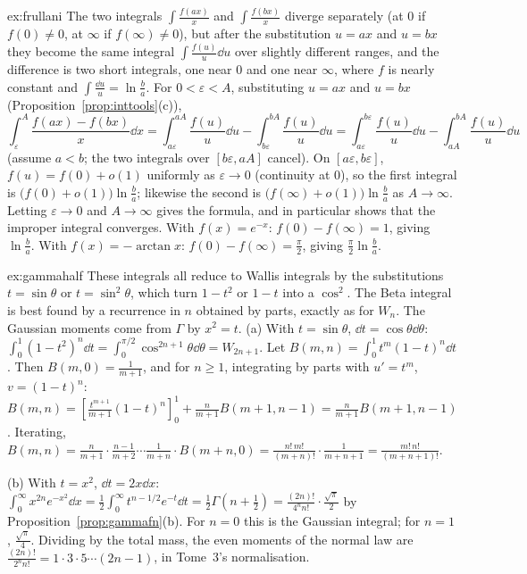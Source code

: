 \begin{solution}{ex:frullani}
\idea The two integrals $\int\frac{f(ax)}x$ and $\int\frac{f(bx)}x$ diverge separately (at $0$ if $f(0)\ne0$, at $\infty$ if $f(\infty)\ne0$), but after the substitution $u=ax$ and $u=bx$ they become the same integral $\int\frac{f(u)}u\dd u$ over slightly different ranges, and the difference is two short integrals, one near $0$ and one near $\infty$, where $f$ is nearly constant and $\int\frac{\dd u}u=\ln\frac ba$.
\writeup For $0<\varepsilon<A$, substituting $u=ax$ and $u=bx$ (Proposition~\ref{prop:inttools}(c)),
\[
\int_\varepsilon^A\frac{f(ax)-f(bx)}x\dd x=\int_{a\varepsilon}^{aA}\frac{f(u)}u\dd u-\int_{b\varepsilon}^{bA}\frac{f(u)}u\dd u=\int_{a\varepsilon}^{b\varepsilon}\frac{f(u)}u\dd u-\int_{aA}^{bA}\frac{f(u)}u\dd u
\]
(assume $a<b$; the two integrals over $[b\varepsilon,aA]$ cancel). On $[a\varepsilon,b\varepsilon]$, $f(u)=f(0)+o(1)$ uniformly as $\varepsilon\to0$ (continuity at $0$), so the first integral is $\bigl(f(0)+o(1)\bigr)\ln\frac ba$; likewise the second is $\bigl(f(\infty)+o(1)\bigr)\ln\frac ba$ as $A\to\infty$. Letting $\varepsilon\to0$ and $A\to\infty$ gives the formula, and in particular shows that the improper integral converges.
With $f(x)=e^{-x}$: $f(0)-f(\infty)=1$, giving $\ln\frac ba$. With $f(x)=-\arctan x$: $f(0)-f(\infty)=\frac\pi2$, giving $\frac\pi2\ln\frac ba$.
\end{solution}

\begin{solution}{ex:gammahalf}
\idea These integrals all reduce to Wallis integrals by the substitutions $t=\sin\theta$ or $t=\sin^2\theta$, which turn $1-t^2$ or $1-t$ into a $\cos^2$. The Beta integral is best found by a recurrence in $n$ obtained by parts, exactly as for $W_n$. The Gaussian moments come from $\Gamma$ by $x^2=t$.
\writeup (a) With $t=\sin\theta$, $\dd t=\cos\theta\dd\theta$: $\int_0^1(1-t^2)^n\dd t=\int_0^{\pi/2}\cos^{2n+1}\theta\dd\theta=W_{2n+1}$.
Let $B(m,n)=\int_0^1t^m(1-t)^n\dd t$. Then $B(m,0)=\frac1{m+1}$, and for $n\ge1$, integrating by parts with $u'=t^m$, $v=(1-t)^n$: $B(m,n)=\left[\frac{t^{m+1}}{m+1}(1-t)^n\right]_0^1+\frac n{m+1}B(m+1,n-1)=\frac n{m+1}B(m+1,n-1)$. Iterating, $B(m,n)=\frac{n}{m+1}\cdot\frac{n-1}{m+2}\cdots\frac1{m+n}\cdot B(m+n,0)=\frac{n!\,m!}{(m+n)!}\cdot\frac1{m+n+1}=\frac{m!\,n!}{(m+n+1)!}$.

(b) With $t=x^2$, $\dd t=2x\dd x$: $\int_0^\infty x^{2n}e^{-x^2}\dd x=\frac12\int_0^\infty t^{n-1/2}e^{-t}\dd t=\frac12\Gamma\left(n+\frac12\right)=\frac{(2n)!}{4^nn!}\cdot\frac{\sqrt\pi}2$ by Proposition~\ref{prop:gammafn}(b). For $n=0$ this is the Gaussian integral; for $n=1$, $\frac{\sqrt\pi}4$. Dividing by the total mass, the even moments of the normal law are $\frac{(2n)!}{2^nn!}=1\cdot3\cdot5\cdots(2n-1)$, in Tome~3's normalisation.
\end{solution}

